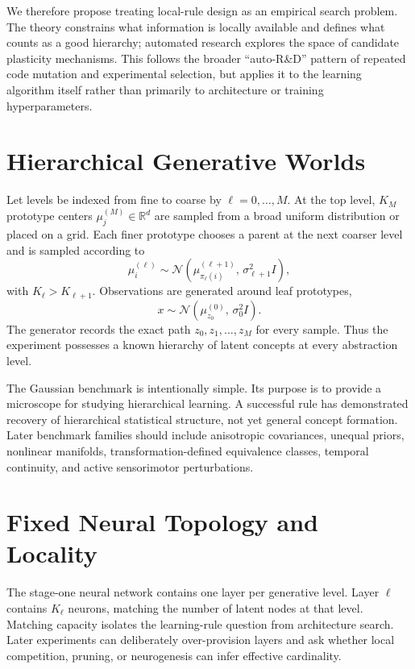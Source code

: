 \documentclass[11pt]{article}
\begin{document}
We therefore propose treating local-rule design as an empirical search problem. The theory constrains what information is locally available and defines what counts as a good hierarchy; automated research explores the space of candidate plasticity mechanisms. This follows the broader ``auto-R\&D'' pattern of repeated code mutation and experimental selection, but applies it to the learning algorithm itself rather than primarily to architecture or training hyperparameters.

\section{Hierarchical Generative Worlds}
Let levels be indexed from fine to coarse by $\ell=0,\dots,M$. At the top level, $K_M$ prototype centers $\mu^{(M)}_j\in\mathbb{R}^d$ are sampled from a broad uniform distribution or placed on a grid. Each finer prototype chooses a parent at the next coarser level and is sampled according to
\begin{equation}
\mu^{(\ell)}_i \sim \mathcal{N}\!\left(\mu^{(\ell+1)}_{\pi_\ell(i)},\,\sigma_{\ell+1}^2 I\right),
\end{equation}
with $K_{\ell}>K_{\ell+1}$. Observations are generated around leaf prototypes,
\begin{equation}
x \sim \mathcal{N}\!\left(\mu^{(0)}_{z_0},\,\sigma_0^2 I\right).
\end{equation}
The generator records the exact path $z_0,z_1,\ldots,z_M$ for every sample. Thus the experiment possesses a known hierarchy of latent concepts at every abstraction level.

The Gaussian benchmark is intentionally simple. Its purpose is to provide a microscope for studying hierarchical learning. A successful rule has demonstrated recovery of hierarchical statistical structure, not yet general concept formation. Later benchmark families should include anisotropic covariances, unequal priors, nonlinear manifolds, transformation-defined equivalence classes, temporal continuity, and active sensorimotor perturbations.

\section{Fixed Neural Topology and Locality}
The stage-one neural network contains one layer per generative level. Layer $\ell$ contains $K_\ell$ neurons, matching the number of latent nodes at that level. Matching capacity isolates the learning-rule question from architecture search. Later experiments can deliberately over-provision layers and ask whether local competition, pruning, or neurogenesis can infer effective cardinality.
\end{document}
